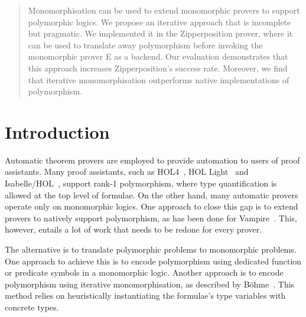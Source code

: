 \documentclass[runningheads]{llncs}
\begin{document}
\author{Tanguy Bozec \and
Jasmin Blanchette}




\maketitle

\begin{sloppy}
\begin{abstract}
Monomorphisation can be used to extend monomorphic provers to support polymorphic logics. We propose an iterative approach that is incomplete but pragmatic. We implemented it in the Zipperposition prover, where it can be used to translate away polymorphism before invoking the monomorphic prover E as a backend. Our evaluation demonstrates that this approach increases Zipperposition's success rate. Moreover, we find that iterative monomorphisation outperforms native implementations of polymorphism.

\end{abstract}
\end{sloppy}

\section{Introduction}

Automatic theorem provers are employed to provide automation to users of proof assistants. Many proof assistants, such as HOL4~\cite{slind-norrish-2008}, HOL Light~\cite{harrison-2009} and Isabelle/HOL~\cite{nipkow-et-al-2002}, support rank-1 polymorphism, where type quantification is allowed at the top level of formulae. On the other hand, many automatic provers operate only on monomorphic logics. One approach to close this gap is to extend provers to natively support polymorphism, as has been done for Vampire~\cite{bhayat-reger-2020}. This, however, entails a lot of work that needs to be redone for every prover.

The alternative is to translate polymorphic problems to monomorphic problems.
One approach \cite[Section~9]{mono-trans} to achieve this is to encode polymorphism using dedicated function or predicate symbols in a monomorphic logic. Another approach is to encode polymorphism using {iterative monomorphisation}, as described by B\"ohme~\cite[Section 2.2.1]{sb-phd}. This method relies on heuristically instantiating the formulae's type variables with concrete types.
\end{document}
